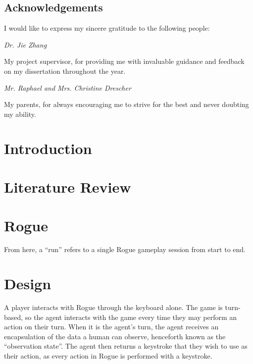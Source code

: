 \documentclass[11pt,a4paper]{article}
\begin{document}
\newpage

\tableofcontents
\listoffigures
\listoftables

\newpage

\begin{center}
    \section*{Acknowledgements}

    I would like to express my sincere gratitude to the following people:

    \vspace{3mm}

    \emph{Dr. Jie Zhang}
    
    My project supervisor, for providing me with invaluable guidance and feedback on my dissertation throughout the year.

    \vspace{3mm}

    \emph{Mr. Raphael and Mrs. Christine Drescher}
    
    My parents, for always encouraging me to strive for the best and never doubting my ability.
\end{center}

\newpage


\section{Introduction}

\section{Literature Review}

\section{Rogue}
From here, a ``run'' refers to a single Rogue gameplay session from start to end.

\section{Design}
A player interacts with Rogue through the keyboard alone. The game is turn-based, so the agent interacts with the game every time they may perform an action on their turn. When it is the agent's turn, the agent receives an encapsulation of the data a human can observe, henceforth known as the ``observation state''. The agent then returns a keystroke that they wish to use as their action, as every action in Rogue is performed with a keystroke.
\end{document}
